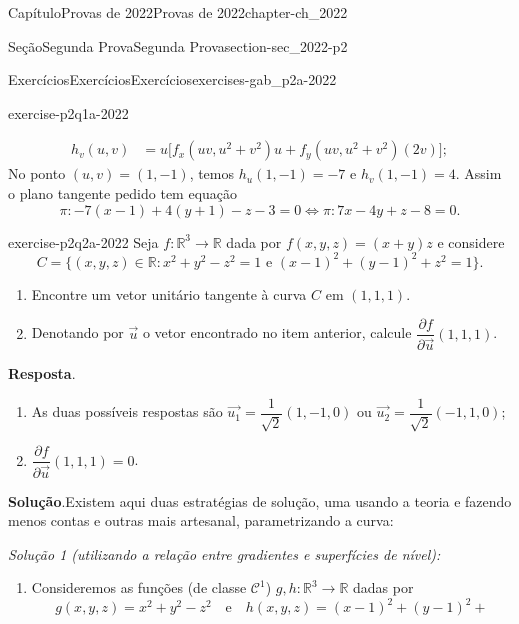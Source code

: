 \documentclass[oneside,10pt,]{book}
\newcommand{\blocktitlefont}{\relax}
\numberwithin{equation}{section}
\newcommand{\R}{\mathbb R}
\begin{document}
\begin{chapterptx}{Capítulo}{Provas de 2022}{}{Provas de 2022}{}{}{chapter-ch_2022}
\begin{sectionptx}{Seção}{Segunda Prova}{}{Segunda Prova}{}{}{section-sec_2022-p2}
\begin{exercises-subsection-numberless}{Exercícios}{Exercícios}{}{Exercícios}{}{}{exercises-gab_p2a-2022}
\begin{divisionexercise}{1}{}{}{exercise-p2q1a-2022}
\begin{enumerate}[label=\alph*.]
\begin{align*}
h_v(u,v)&=u\Big[f_x(uv,u^2+v^2)u+f_y(uv,u^2+v^2)(2v)\Big];
\end{align*}
No ponto \((u,v)=(1,-1)\), temos \(h_u(1,-1)=-7\) e \(h_v(1,-1)=4\). Assim o plano tangente pedido tem equação%
\begin{equation*}
\pi\colon -7(x-1)+4(y+1)-z-3=0\iff \boxed{\pi\colon 7x-4y+z-8 = 0}\text{.}
\end{equation*}
%
\end{enumerate}
%
\end{divisionexercise}%
\begin{divisionexercise}{2}{}{}{exercise-p2q2a-2022}%
Seja \(f\colon\R^3\to\R\) dada por \(f(x,y,z)=(x+y)z\) e considere%
\begin{equation*}
C=\big\{(x,y,z)\in\R\colon x^2 + y^2 - z^2 =
1\text{ e }(x-1)^2+(y-1)^2+z^2=1\big\}.
\end{equation*}
%
\begin{enumerate}[label=\alph*]
\item{}Encontre um vetor unitário tangente à curva \(C\) em \((1,1,1)\).%
\item{}Denotando por \(\vec{u}\) o vetor encontrado no item anterior, calcule \(\dfrac{\partial f}{\partial
\vec{u}}(1,1,1)\).%
\end{enumerate}
%
\par\smallskip%
\noindent\textbf{\blocktitlefont Resposta}.\hypertarget{answer-p2q2a-2022-b}{}\quad{}%
\begin{enumerate}[label=\alph*]
\item{}As duas possíveis respostas são \(\vec{u_1}=\dfrac{1}{\sqrt{2}}(1,-1,0)\) ou \(\vec{u_2}=\dfrac{1}{\sqrt{2}}(-1,1,0)\);%
\item{}\(\dfrac{\partial f}{\partial \vec{u}}(1,1,1)=0\).%
\end{enumerate}
%
\par\smallskip%
\noindent\textbf{\blocktitlefont Solução}.\hypertarget{solution-p2q2a-2022-c}{}\quad{}Existem aqui duas estratégias de solução, uma usando a teoria e fazendo menos contas e outras mais artesanal, parametrizando a curva:%
\par
\emph{Solução 1 (utilizando a relação entre gradientes e superfícies de nível):}%
\begin{enumerate}[label=(\alph*)]
\item{}Consideremos as funções (de classe \(\mathscr{C}^1\)) \(g,h\colon\R^3\to\R\) dadas por%
\begin{equation*}
g(x,y,z) = x^2 + y^2 -
z^2 \quad \text{e} \quad h(x,y,z) = (x-1)^2 + (y-1)^2 +

\end{equation*}
\end{enumerate}
\end{divisionexercise}
\end{exercises-subsection-numberless}
\end{sectionptx}
\end{chapterptx}
\end{document}
